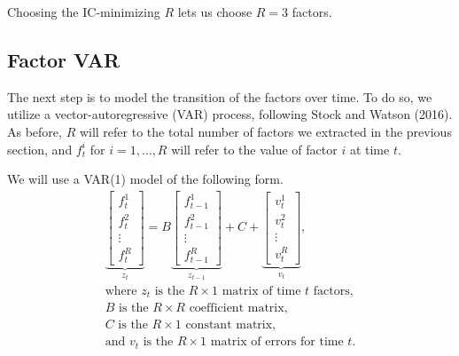 \documentclass[11pt, letterpaper]{article}\usepackage[]{graphicx}\usepackage[]{color}
\begin{document}
Choosing the IC-minimizing $R$ lets us choose $R = 3$ factors.



\subsection{Factor VAR}
The next step is to model the transition of the factors over time. To do so, we utilize a vector-autoregressive (VAR) process, following Stock and Watson (2016). As before, $R$ will refer to the total number of factors we extracted in the previous section, and $f^i_t$ for $i = 1, \dots, R$ will refer to the value of factor $i$ at time $t$.

We will use a VAR(1) model of the following form.
\begin{align*}
\underbrace{\begin{bmatrix}
	f^1_{t}\\
	f^2_{t}\\
	\vdots \\
	f^R_{t}
\end{bmatrix}}_{z_t}
=
B
\underbrace{\begin{bmatrix}
	f^1_{t-1}\\
	f^2_{t-1}\\
	\vdots \\
	f^R_{t-1}
\end{bmatrix}}_{z_{t-1}}
+
C
+
\underbrace{\begin{bmatrix}
v^1_t\\
v^2_t\\
\vdots\\
v^R_t
\end{bmatrix}}_{v_t},\\
\text{where $z_t$ is the $R \times 1$ matrix of time $t$ factors,}\\
\text{$B$ is the $R \times R$ coefficient matrix,}\\
\text{$C$ is the $R \times 1$ constant matrix,}\\
\text{and $v_t$ is the $R \times 1$ matrix of errors for time $t$.}
\end{align*}
\end{document}
